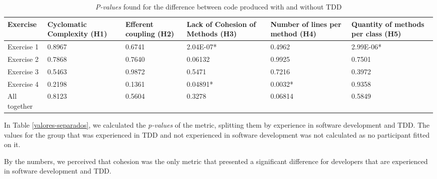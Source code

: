 \documentclass[times]{elsarticle}
\begin{document}
\begin{table*}
	\centering
	\begin{tabular}{ | p{1.5cm} | p{1.5cm} | p{1.5cm} | p{1.5cm} | p{1.5cm} | p{1.5cm} |}
		\hline
		\textbf{Exercise} & \textbf{Cyclomatic Complexity (H1)} & \textbf{Efferent coupling (H2)} & \textbf{Lack of Cohesion of Methods (H3)} & \textbf{Number of lines per method (H4)} 
		& \textbf{Quantity of methods per class (H5)} \\
		\hline
		Exercise 1 &	0.8967	&	0.6741 &	\cellcolor[gray]{0.8}2.04E-07* &	0.4962 &	\cellcolor[gray]{0.8}2.99E-06* \\
		Exercise 2	& 0.7868	&	0.7640 &	0.06132 &	0.9925 &	0.7501 \\
		Exercise 3	& 0.5463	&	0.9872 &	0.5471 &	0.7216 &	0.3972\\
		Exercise 4	& 0.2198	&	0.1361 &	\cellcolor[gray]{0.8}0.04891* &	\cellcolor[gray]{0.8}0.0032* &	0.9358\\
		\hline
		All together &	0.8123	&	0.5604 &	0.3278 &	0.06814 &	0.5849\\
		\hline
	\end{tabular}
	\caption{\textit{P-values} found for the difference between code produced with and without TDD}
	\label{metricas-industria}
\end{table*}

In Table \ref{valores-separados}, we calculated the \textit{p-values} of the metric,
splitting them by experience in software development and TDD. The values for the group that
was experienced in TDD and not experienced in software development was not calculated as no
participant fitted on it.

By the numbers, we perceived that cohesion was the only metric that presented a significant
difference for developers that are experienced in software development and TDD.
\end{document}
